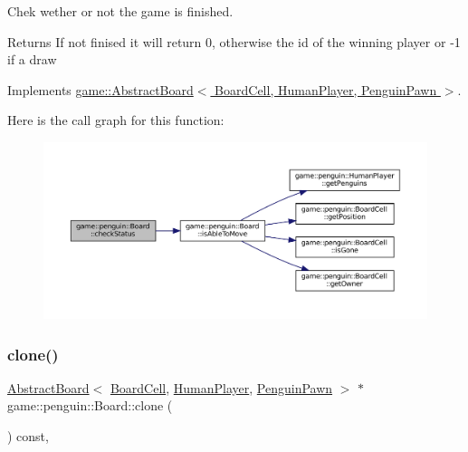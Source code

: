 Chek wether or not the game is finished. 

\begin{DoxyReturn}{Returns}
If not finised it will return 0, otherwise the id of the winning player or -\/1 if a draw 
\end{DoxyReturn}


Implements \hyperlink{classgame_1_1_abstract_board_a689982e6640633d78008157906c6d63a}{game\+::\+Abstract\+Board$<$ Board\+Cell, Human\+Player, Penguin\+Pawn $>$}.

Here is the call graph for this function\+:
\nopagebreak
\begin{figure}[H]
\begin{center}
\leavevmode
\includegraphics[width=350pt]{classgame_1_1penguin_1_1_board_a3d659743bc33b43168c82dc4e2d3b00e_cgraph}
\end{center}
\end{figure}
\mbox{\label{classgame_1_1penguin_1_1_board_acad4a3c7bee2103aea4586356ceabb8e}} 
\subsubsection{\texorpdfstring{clone()}{clone()}}
{\footnotesize\ttfamily \hyperlink{classgame_1_1_abstract_board}{Abstract\+Board}$<$ \hyperlink{classgame_1_1penguin_1_1_board_cell}{Board\+Cell}, \hyperlink{classgame_1_1penguin_1_1_human_player}{Human\+Player}, \hyperlink{classgame_1_1penguin_1_1_penguin_pawn}{Penguin\+Pawn} $>$ $\ast$ game\+::penguin\+::\+Board\+::clone (\begin{DoxyParamCaption}{ }\end{DoxyParamCaption}) const\hspace{0.3cm}{\ttfamily [override]}, {\ttfamily [virtual]}}



